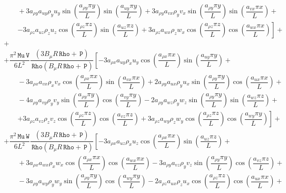 \documentclass[10pt]{article}
\newcommand{\Rho}{\,\mathtt{Rho}}
\newcommand{\PP}{\,\mathtt{P}}
\newcommand{\V}{\,\mathtt{V}}
\newcommand{\W}{\,\mathtt{W}}
\newcommand{\MU}{\,\mathtt{Mu}}
\begin{document}
\begin{equation}
\begin{split}
    &\qquad+3 a_{\rho y} a_{uy} \rho_y u_y \sin\left(\dfrac{a_{\rho y} \pi y}{L}\right) \sin\left(\dfrac{a_{uy} \pi y}{L}\right)+3 a_{\rho y} a_{vx} \rho_y v_x \sin\left(\dfrac{a_{\rho y} \pi y}{L}\right) \sin\left(\dfrac{a_{vx} \pi x}{L}\right)+\\
    &\qquad\left. -3 a_{\rho z} a_{uz} \rho_z u_z \cos\left(\dfrac{a_{\rho z} \pi z}{L}\right) \sin\left(\dfrac{a_{uz} \pi z}{L}\right)+3 a_{\rho z} a_{wx} \rho_z w_x \cos\left(\dfrac{a_{\rho z} \pi z}{L}\right) \cos\left(\dfrac{a_{wx} \pi x}{L}\right)\right] +\\
&+
 \end{split}
\end{equation}
\begin{equation}
 \begin{split}
%
&+\dfrac{ \pi^2 \MU \V }{6L^2} \dfrac{(3 B_\mu R \Rho+\PP)}{\Rho (B_\mu R \Rho+\PP) }   \left[-3 a_{\rho x} a_{uy} \rho_x u_y \cos\left(\dfrac{a_{\rho x} \pi x}{L}\right) \sin\left(\dfrac{a_{uy} \pi y}{L}\right)+\right.\\
    &\qquad-3 a_{\rho x} a_{vx} \rho_x v_x \cos\left(\dfrac{a_{\rho x} \pi x}{L}\right) \sin\left(\dfrac{a_{vx} \pi x}{L}\right)+2 a_{\rho y} a_{ux} \rho_y u_x \sin\left(\dfrac{a_{\rho y} \pi y}{L}\right) \cos\left(\dfrac{a_{ux} \pi x}{L}\right)+\\
    &\qquad-4 a_{\rho y} a_{vy} \rho_y v_y \sin\left(\dfrac{a_{\rho y} \pi y}{L}\right) \cos\left(\dfrac{a_{vy} \pi y}{L}\right)-2 a_{\rho y} a_{wz} \rho_y w_z \sin\left(\dfrac{a_{\rho y} \pi y}{L}\right) \sin\left(\dfrac{a_{wz} \pi z}{L}\right)+\\
    &\qquad\left. +3 a_{\rho z} a_{vz} \rho_z v_z \cos\left(\dfrac{a_{\rho z} \pi z}{L}\right) \cos\left(\dfrac{a_{vz} \pi z}{L}\right)+3 a_{\rho z} a_{wy} \rho_z w_y \cos\left(\dfrac{a_{\rho z} \pi z}{L}\right) \cos\left(\dfrac{a_{wy} \pi y}{L}\right)\right] +\\
%
&+\dfrac{ \pi^2 \MU \W }{6L^2} \dfrac{(3 B_\mu R \Rho+\PP)}{\Rho (B_\mu R \Rho+\PP) }   \left[-3 a_{\rho x} a_{uz} \rho_x u_z \cos\left(\dfrac{a_{\rho x} \pi x}{L}\right) \sin\left(\dfrac{a_{uz} \pi z}{L}\right)+\right.\\
    &\qquad+3 a_{\rho x} a_{wx} \rho_x w_x \cos\left(\dfrac{a_{\rho x} \pi x}{L}\right) \cos\left(\dfrac{a_{wx} \pi x}{L}\right)-3 a_{\rho y} a_{vz} \rho_y v_z \sin\left(\dfrac{a_{\rho y} \pi y}{L}\right) \cos\left(\dfrac{a_{vz} \pi z}{L}\right)+\\
    &\qquad-3 a_{\rho y} a_{wy} \rho_y w_y \sin\left(\dfrac{a_{\rho y} \pi y}{L}\right) \cos\left(\dfrac{a_{wy} \pi y}{L}\right)-2 a_{\rho z} a_{ux} \rho_z u_x \cos\left(\dfrac{a_{\rho z} \pi z}{L}\right) \cos\left(\dfrac{a_{ux} \pi x}{L}\right)+\\

\end{split}
\end{equation}
\end{document}
